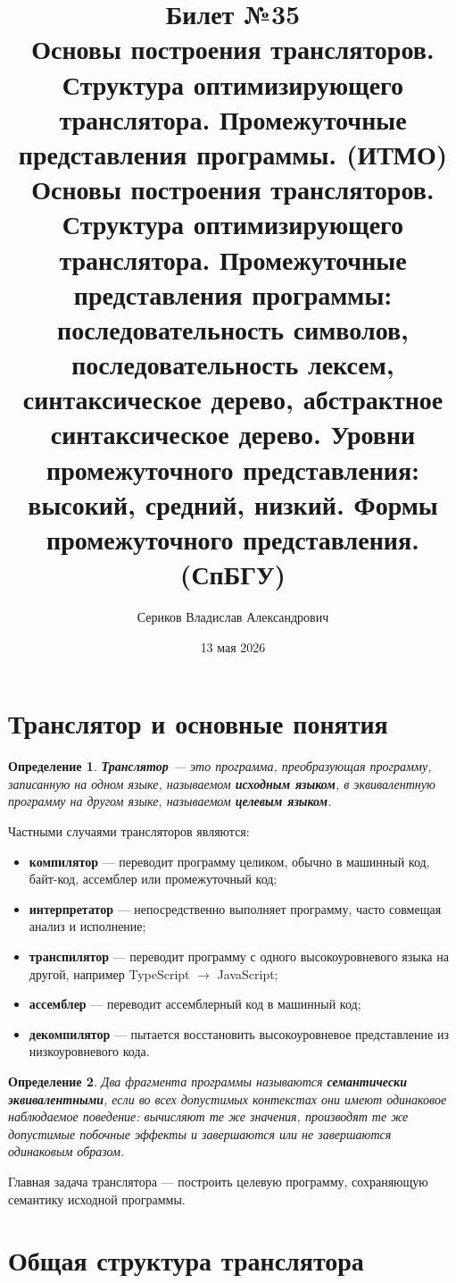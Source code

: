 \documentclass[12pt,a4paper]{article}
\title{Билет №35 \\ \small Основы построения трансляторов. Структура оптимизирующего транслятора. Промежуточные представления программы. (ИТМО) \\ Основы построения трансляторов. Структура оптимизирующего транслятора. Промежуточные представления программы: последовательность символов, последовательность лексем, синтаксическое дерево, абстрактное синтаксическое дерево. Уровни промежуточного представления: высокий, средний, низкий. Формы промежуточного представления. (СпБГУ)}
\author{Сериков Владислав Александрович}
\date{13 мая 2026}
\newtheorem{definition}{Определение}
\begin{document}
\maketitle
\tableofcontents
\newpage

\section{Транслятор и основные понятия}

\begin{definition}
\textbf{Транслятор} --- это программа, преобразующая программу, записанную на одном языке, называемом \textbf{исходным языком}, в эквивалентную программу на другом языке, называемом \textbf{целевым языком}.
\end{definition}

Частными случаями трансляторов являются:
\begin{itemize}
    \item \textbf{компилятор} --- переводит программу целиком, обычно в машинный код, байт-код, ассемблер или промежуточный код;
    \item \textbf{интерпретатор} --- непосредственно выполняет программу, часто совмещая анализ и исполнение;
    \item \textbf{транспилятор} --- переводит программу с одного высокоуровневого языка на другой, например TypeScript $\to$ JavaScript;
    \item \textbf{ассемблер} --- переводит ассемблерный код в машинный код;
    \item \textbf{декомпилятор} --- пытается восстановить высокоуровневое представление из низкоуровневого кода.
\end{itemize}

\begin{definition}
Два фрагмента программы называются \textbf{семантически эквивалентными}, если во всех допустимых контекстах они имеют одинаковое наблюдаемое поведение: вычисляют те же значения, производят те же допустимые побочные эффекты и завершаются или не завершаются одинаковым образом.
\end{definition}

Главная задача транслятора --- построить целевую программу, сохраняющую семантику исходной программы.

\section{Общая структура транслятора}
\end{document}
